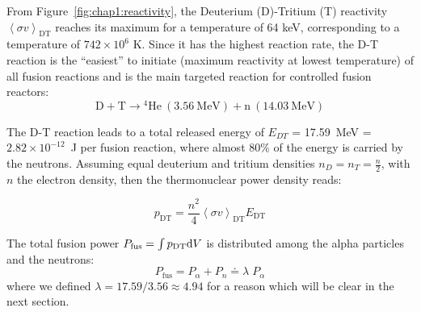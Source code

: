 From Figure~\ref{fig:chap1:reactivity}, the Deuterium (D)-Tritium (T) reactivity $\left<\sigma v\right>_{\mathrm{DT}}$ reaches its maximum for a temperature of 64 keV, corresponding to a temperature of $742\times10^6$ K. Since it has the highest reaction rate, the D-T reaction is the “easiest” to initiate (maximum reactivity at lowest temperature) of all fusion reactions and is the main targeted reaction for controlled fusion reactors: 
\begin{equation}
	\mathrm{D + T} \longrightarrow \mathrm{{}^4 He~(3.56~MeV) + n~(14.03~MeV)}
\end{equation}

The D-T reaction leads to a total released energy of $E_{DT}$ = 17.59~\si{MeV} = $2.82\times 10^{-12}$~\si{J} per fusion reaction, where almost 80\% of the energy is carried by the neutrons. Assuming equal deuterium and tritium densities $n_D = n_T = \frac{n}{2}$, with $n$ the electron density, then the thermonuclear power density reads:

\begin{equation}
p_{\mathrm{DT}} = 
	\frac{n^2}{4}  \left< \sigma v \right>_{\mathrm{DT}} E_{\mathrm{DT}}
	\label{eq:fusion_power}
\end{equation}

The total fusion power $P_{\mathrm{fus}}=\int p_{\mathrm{DT}} {\mathrm{d}} V$ is distributed among the alpha particles and the neutrons: 
\begin{equation}
P_{\mathrm{fus}}
= 
P_\alpha + P_n 
\doteq
\lambda \; P_\alpha
\label{eq:P_fus_Palpha}
\end{equation}
where we defined $\lambda = 17.59/3.56 \approx 4.94$ for a reason which will be clear in the next section.


%

